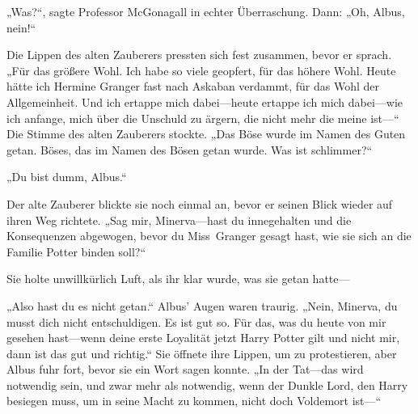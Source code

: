 „Was?“, sagte Professor McGonagall in echter Überraschung. Dann: „Oh, Albus, nein!“

Die Lippen des alten Zauberers pressten sich fest zusammen, bevor er sprach.
„Für das größere Wohl. Ich habe so viele geopfert, für das höhere Wohl. Heute hätte ich Hermine Granger fast nach Askaban verdammt, für das Wohl der Allgemeinheit. Und ich ertappe mich dabei—heute ertappe ich mich dabei—wie ich anfange, mich über die Unschuld zu ärgern, die nicht mehr die meine ist—“
Die Stimme des alten Zauberers stockte.
„Das Böse wurde im Namen des Guten getan. Böses, das im Namen des Bösen getan wurde. Was ist schlimmer?“

„Du bist dumm, Albus.“

Der alte Zauberer blickte sie noch einmal an, bevor er seinen Blick wieder auf ihren Weg richtete. „Sag mir, Minerva—hast du innegehalten und die Konsequenzen abgewogen, bevor du Miss~Granger gesagt hast, wie sie sich an die Familie Potter binden soll?“

Sie holte unwillkürlich Luft, als ihr klar wurde, was sie getan hatte—

„Also hast du es nicht getan.“ Albus’ Augen waren traurig. „Nein, Minerva, du musst dich nicht entschuldigen. Es ist gut so. Für das, was du heute von mir gesehen hast—wenn deine erste Loyalität jetzt Harry Potter gilt und nicht mir, dann ist das gut und richtig.“
Sie öffnete ihre Lippen, um zu protestieren, aber Albus fuhr fort, bevor sie ein Wort sagen konnte. „In der Tat—das wird notwendig sein, und zwar mehr als notwendig, wenn der Dunkle Lord, den Harry besiegen muss, um in seine Macht zu kommen, nicht doch Voldemort ist—“

